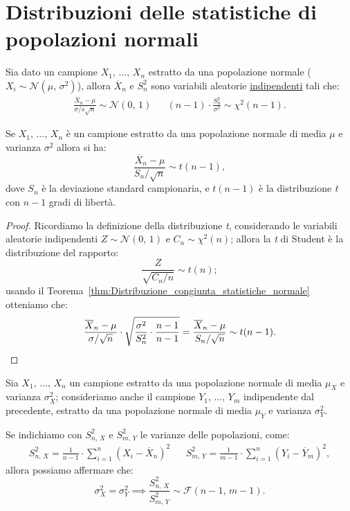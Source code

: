     \section{Distribuzioni delle statistiche di popolazioni normali}
        \begin{thm}\label{thm:Distribuzione_congiunta_statistiche_normale}
            Sia dato un campione $X_1,\, \ldots,\, X_{n}$ estratto da una popolazione normale 
            ($X_i \sim \mathcal{N}(\mu,\, \sigma^2)$), allora $\overline{X}_n$ e $S_n^2$ sono 
            variabili aleatorie \underline{indipendenti} tali che:
            \begin{align}\label{eq:Distribuzione_congiunta_statistiche_normale}
                \frac{\overline{X}_n -\mu}{\sigma /s\sqrt{n}} \sim \mathcal{N}(0,\,1)
                & & (n-1)\cdot \frac{S_n^2}{\sigma^2} \sim \chi^2(n-1)
            .\end{align}
        \end{thm}
        \begin{prty}\label{prty:Distribuzione_congiunta_statistiche_normale}
            Se $X_1,\, \ldots,\, X_{n}$ è un campione estratto da una popolazione normale di media $\mu$ e 
            varianza $\sigma^2$ allora si ha: \[
                \frac{\overline{X}_n - \mu}{S_n /\sqrt{n}} \sim t(n-1)
            ,\] dove $S_n$ è la deviazione standard campionaria, e $t(n-1)$ è la distribuzione 
            \emph{t} con $n-1$ gradi di libertà.
        \end{prty}
        \begin{proof}
            Ricordiamo la definizione della distribuzione \emph{t}, considerando le variabili 
            aleatorie indipendenti $Z \sim \mathcal{N}(0,\,1)$ e $C_n \sim \chi^2(n)$; allora la 
            \emph{t} di Student è la distribuzione del rapporto: \[
                \frac{Z}{\sqrt{C_n /n}} \sim t(n)
            ;\] usando il Teorema~\ref{thm:Distribuzione_congiunta_statistiche_normale} otteniamo che: \[
                \frac{\overline{X}_n - \mu}{\sigma /\sqrt{n}} \cdot \sqrt{\frac{\sigma^2}{S_n^2} 
                \cdot \frac{n-1}{n-1}} = \frac{\overline{X}_n - \mu}{S_n /\sqrt{n}}
                \sim t(n-1)
            .\qedhere\]
        \end{proof}
        \begin{prty}
            Sia $X_1,\, \ldots,\, X_{n}$ un campione estratto da una popolazione normale di media $\mu_X$ e 
            varianza $\sigma^2_X$; consideriamo anche il campione $Y_1,\, \ldots,\, Y_{m}$ indipendente 
            dal precedente, estratto da una popolazione normale di media $\mu_Y$ e varianza $\sigma^2_Y$.

            Se indichiamo con $S_{n,\,X}^2$ e $S_{m,\,Y}^2$ le varianze delle popolazioni, come:
            \begin{align*}
                S_{n,\,X}^2 = \frac{1}{n-1}\cdot \sum_{i=1}^{n} (X_i - \overline{X}_n)^2
                & & S_{m,\,Y}^2 = \frac{1}{m-1}\cdot \sum_{i=1}^{n} (Y_i - \overline{Y}_m)^2
            ,\end{align*}
            allora possiamo affermare che: \[
            \sigma_X^2 = \sigma_Y^2 \implies \frac{S_{n,\,X}^2}{S_{m,\,Y}^2} 
            \sim \mathcal{F}(n-1,\, m-1)
            .\]
        \end{prty}
